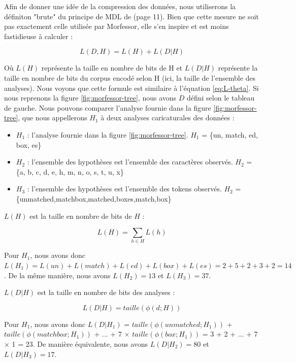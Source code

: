 \documentclass[PhD-Yoann-Dupont.tex]{subfiles}
\begin{document}
Afin de donner une idée de la compression des données, nous utiliserons la définiton "brute" du principe de MDL de \citet{grunwald2005tutorial} (page 11). Bien que cette mesure ne soit pas exactement celle utilisée par Morfessor, elle s'en inspire et est moins fastidieuse à calculer :

\begin{equation}
L(D,H) = L(H) + L(D|H)
\end{equation}

Où $L(H)$ représente la taille en nombre de bits de H et $L(D|H)$ représente la taille en nombre de bits du corpus encodé selon H (ici, la taille de l'ensemble des analyses). Nous voyons que cette formule est similaire à l'équation \ref{eq:L-theta}. Si nous reprenons la figure \ref{fig:morfessor-tree}, nous avons $D$ défini selon le tableau de gauche. Nous pouvons comparer l'analyse fournie dans la figure \ref{fig:morfessor-tree}, que nous appellerons $H_{1}$ à deux analyses caricaturales des données :

\begin{itemize}
    \item $H_{1}$ : l'analyse fournie dans la figure \ref{fig:morfessor-tree}. $H_{1}$ = \{un, match, ed, box, es\}
    \item $H_{2}$ : l'ensemble des hypothèses est l'ensemble des caractères observés. $H_{2}$ = \{a, b, c, d, e, h, m, n, o, s, t, u, x\}
    \item $H_{3}$ : l'ensemble des hypothèses est l'ensemble des tokens observés. $H_{2}$ = \{unmatched,matchbox,matched,boxes,match,box\}
\end{itemize}

$L(H)$ est la taille en nombre de bits de $H$ :

\begin{equation}
L(H) = \sum_{h \in H} L(h)
\end{equation}

Pour $H_{1}$, nous avons donc $L(H_{1}) = L(un) + L(match) + L(ed) + L(box) + L(es) = 2 + 5 + 2 + 3 + 2 = 14$. De la même manière, nous avons $L(H_{2})=13$ et $L(H_{3})=37$.

$L(D|H)$ est la taille en nombre de bits des analyses :

\begin{equation}
L(D|H) = taille(\phi(d;H))
\end{equation}

Pour $H_{1}$, nous avons donc $L(D|H_{1})$ = $taille(\phi(unmatched;H_{1}))$ +\\$taille(\phi(matchbox;H_{1}))$ + ... + 7 $\times$ $taille(\phi(box;H_{1}))$ = 3 + 2 + ... + 7 $\times$ 1 = 23. De manière équivalente, nous avons $L(D|H_{2}) = 80$ et $L(D|H_{3}) = 17$.
\end{document}
